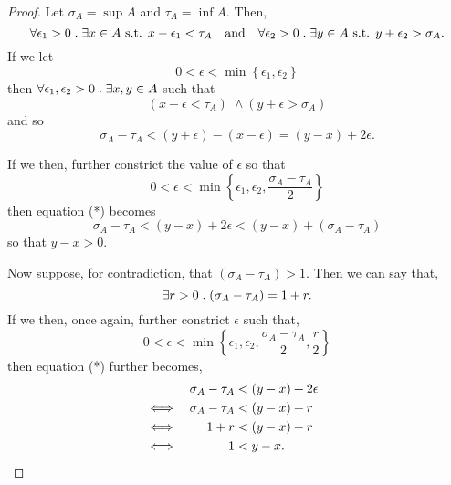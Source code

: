 \documentclass[../MathsNotesBase.tex]{subfiles}
\begin{document}
{		\label{def:infimum}
		
		
		
		\biggerskip		
		\begin{proof}\nl[8]
			Let ${ \sigma_A = \sup A }$ and ${ \tau_A = \inf A }$. Then,
			\[ 
			\forall \epsilon_1 > 0 \;.\; \exists x \in A \text{ s.t. } x - \epsilon_1 < \tau_A \hspace{10pt}\text{and}\hspace{10pt} 
			\forall \epsilon_2 > 0 \;.\; \exists y \in A \text{ s.t. } y + \epsilon_2 > \sigma_A. 
			\]
			If we let
			\[ 0 < \epsilon < \min \left\{ \epsilon_1, \epsilon_2 \right\} \]
			then ${ \forall \epsilon_1,\epsilon_2 > 0 \;.\; \exists x,y \in A }$ such that
			\[  (x - \epsilon < \tau_A) \; \land (y + \epsilon > \sigma_A) \]
			and so
			\begin{equation}
				\sigma_A - \tau_A < (y + \epsilon) - (x - \epsilon) = (y - x) + 2\epsilon. \tag{*}
			\end{equation}
			
			\nl[8]
			If we then, further constrict the value of $\epsilon$ so that
			\[ 0 < \epsilon < \min \left\{ \epsilon_1, \epsilon_2, \frac{\sigma_A - \tau_A}{2} \right\} \]
			then equation (*) becomes			
			\[ \sigma_A - \tau_A < (y - x) + 2\epsilon < (y - x) + (\sigma_A - \tau_A) \]
			so that ${ y - x > 0 }$.
			
			\nl[8]
			Now suppose, for contradiction, that ${ (\sigma_A - \tau_A) > 1 }$. Then we can say that,
			\[ \exists r > 0 \;.\; (\sigma_A - \tau_A) = 1 + r. \] 
			If we then, once again, further constrict $\epsilon$ such that,
			\[ 0 < \epsilon < \min \left\{ \epsilon_1, \epsilon_2, \frac{\sigma_A - \tau_A}{2}, \frac{r}{2} \right\} \]
			then equation (*) further becomes,
			\[\begin{aligned}
				&& \sigma_A - \tau_A &< (y - x) + 2\epsilon \\
				&\iff & \sigma_A - \tau_A &< (y - x) + r &\text{\scriptsize{}} \\
				&\iff & 1 + r &< (y - x) + r &\text{\scriptsize{}} \\
				&\iff & 1 &< y - x. 
			\end{aligned}\]
			

\end{proof}}
\end{document}
